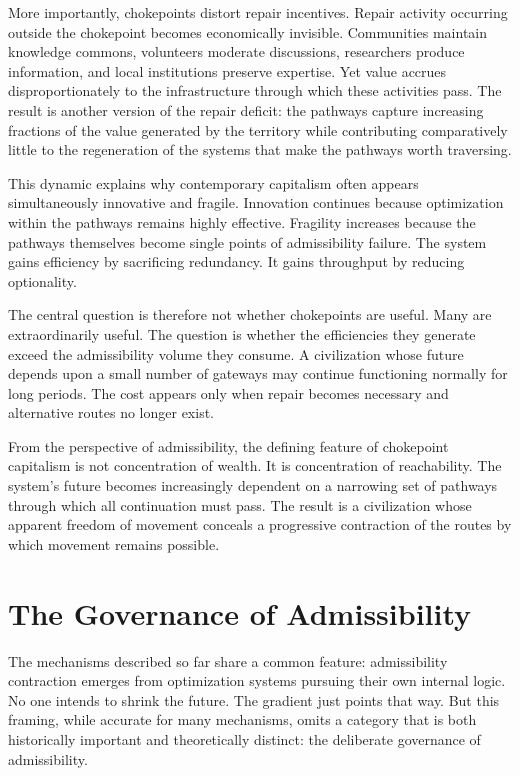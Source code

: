 \documentclass[11pt, letterpaper]{article}
\begin{document}
More importantly, chokepoints distort repair incentives. Repair activity occurring outside the chokepoint becomes economically invisible. Communities maintain knowledge commons, volunteers moderate discussions, researchers produce information, and local institutions preserve expertise. Yet value accrues disproportionately to the infrastructure through which these activities pass. The result is another version of the repair deficit: the pathways capture increasing fractions of the value generated by the territory while contributing comparatively little to the regeneration of the systems that make the pathways worth traversing.

This dynamic explains why contemporary capitalism often appears simultaneously innovative and fragile. Innovation continues because optimization within the pathways remains highly effective. Fragility increases because the pathways themselves become single points of admissibility failure. The system gains efficiency by sacrificing redundancy. It gains throughput by reducing optionality.

The central question is therefore not whether chokepoints are useful. Many are extraordinarily useful. The question is whether the efficiencies they generate exceed the admissibility volume they consume. A civilization whose future depends upon a small number of gateways may continue functioning normally for long periods. The cost appears only when repair becomes necessary and alternative routes no longer exist.

From the perspective of admissibility, the defining feature of chokepoint capitalism is not concentration of wealth. It is concentration of reachability. The system's future becomes increasingly dependent on a narrowing set of pathways through which all continuation must pass. The result is a civilization whose apparent freedom of movement conceals a progressive contraction of the routes by which movement remains possible.

\section{The Governance of Admissibility}

The mechanisms described so far share a common feature: admissibility contraction emerges from optimization systems pursuing their own internal logic. No one intends to shrink the future. The gradient just points that way. But this framing, while accurate for many mechanisms, omits a category that is both historically important and theoretically distinct: the deliberate governance of admissibility.
\end{document}
